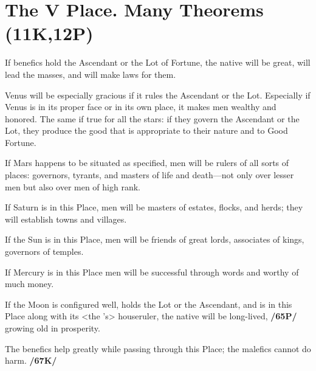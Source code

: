 \section{The V Place. Many Theorems (11K,12P)}
If benefics hold the Ascendant or the Lot of Fortune, the native will be great, will lead the masses, and will make laws for them.

Venus will be especially gracious if it rules the Ascendant or the Lot. Especially if Venus is in its proper face or in its own place, it makes men wealthy and honored. \mndl The same if true for all the stars: if they govern the Ascendant or the Lot, they produce the good that is appropriate to their nature and to Good Fortune. 

If Mars happens to be situated as specified, men will be rulers of all sorts of places: governors, tyrants, and masters of life and death—not only over lesser men but also over men of
high rank. 

If Saturn is in this Place, men will be masters of estates, flocks, and herds; they will establish towns and villages. 

If the Sun is in this Place, men will be friends of great lords, associates of kings, governors of temples. 

If Mercury is in this Place men will be successful through words and worthy of much money. 

If the Moon is configured well, holds the Lot or the Ascendant, and is in this Place along with its <the \Moon’s> houseruler, the native will be long-lived, \textbf{/65P/} growing old in prosperity. 

\mndl The benefics help greatly while passing through this Place; the malefics cannot do harm. \textbf{/67K/}

\newpage